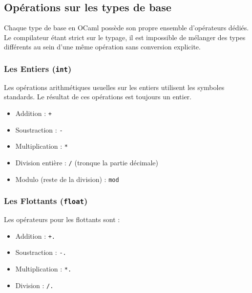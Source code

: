 \documentclass{article}
\begin{document}

\subsection{Opérations sur les types de base}

Chaque type de base en OCaml possède son propre ensemble d'opérateurs dédiés. Le compilateur étant strict sur le typage, il est impossible de mélanger des types différents au sein d'une même opération sans conversion explicite.

\subsubsection{Les Entiers (\texttt{int})}

Les opérations arithmétiques usuelles sur les entiers utilisent les symboles standards. Le résultat de ces opérations est toujours un entier.

\begin{itemize}
    \item Addition : \texttt{+}
    \item Soustraction : \texttt{-}
    \item Multiplication : \texttt{*}
    \item Division entière : \texttt{/} (tronque la partie décimale)
    \item Modulo (reste de la division) : \texttt{mod}
\end{itemize}


\subsubsection{Les Flottants (\texttt{float})}


Les opérateurs pour les flottants sont :
\begin{itemize}
    \item Addition : \texttt{+.}
    \item Soustraction : \texttt{-.}
    \item Multiplication : \texttt{*.}
    \item Division : \texttt{/.}
\end{itemize}
\end{document}
